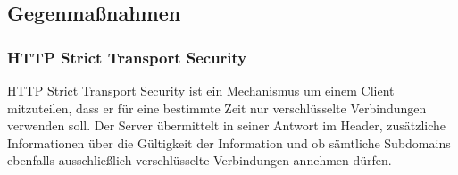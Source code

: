  
\subsection*{Gegenmaßnahmen}

\subsubsection*{HTTP Strict Transport Security}
HTTP Strict Transport Security ist ein Mechanismus um einem Client mitzuteilen, dass er für eine bestimmte Zeit nur verschlüsselte Verbindungen verwenden soll. Der Server übermittelt in seiner Antwort im Header, zusätzliche Informationen über die Gültigkeit der Information und ob sämtliche Subdomains ebenfalls ausschließlich verschlüsselte Verbindungen annehmen dürfen. \cite{hsts} \newpage

